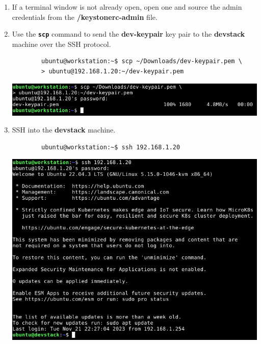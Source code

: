 \documentclass[letterpaper, 12pt]{article}
\begin{document}
\begin{enumerate}
    \item If a terminal window is not already open, open one and source the admin credentials from the 
    \textbf{\texttildemid/keystonerc-admin} file.

    \item Use the \textbf{\texttt{scp}} command to send the \textbf{dev-keypair} key pair to the \textbf{devstack}
    machine over the SSH protocol.
    \begin{lstlisting}
        ubuntu@workstation:~$ scp ~/Downloads/dev-keypair.pem \
        > ubuntu@192.168.1.20:~/dev-keypair.pem
    \end{lstlisting}

    \begin{center}
        \includegraphics[width=\linewidth]{images/part6/step2.png}
    \end{center}

    \item SSH into the \textbf{devstack} machine.
    \begin{lstlisting}
        ubuntu@workstation:~$ ssh 192.168.1.20
    \end{lstlisting}

    \begin{center}
        \includegraphics[width=\linewidth]{images/part6/step3.png}
    \end{center}


\end{enumerate}
\end{document}
